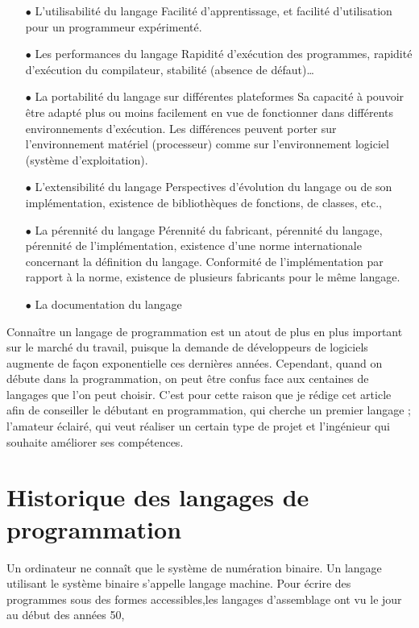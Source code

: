\documentclass[a4paper,12pt]{article} %
\begin{document}
\begin{itemize}
\item[$\bullet$]L’utilisabilité du langage
Facilité d'apprentissage, et facilité d'utilisation pour un programmeur expérimenté.
\item[$\bullet$]Les performances du langage
Rapidité d'exécution des programmes, rapidité d'exécution du compilateur,  stabilité (absence de défaut)…
\item[$\bullet$]La portabilité du langage sur différentes plateformes
Sa capacité à pouvoir être adapté plus ou moins facilement en vue de fonctionner dans différents environnements d'exécution. Les différences peuvent porter sur l'environnement matériel (processeur) comme sur l'environnement logiciel (système d'exploitation).
\item[$\bullet$]L’extensibilité du langage
Perspectives d'évolution du langage ou de son implémentation, existence de bibliothèques de fonctions, de classes, etc.,
\item[$\bullet$]La pérennité du langage
Pérennité du fabricant, pérennité du langage, pérennité de l'implémentation, existence d'une norme internationale concernant la définition du langage. Conformité de l'implémentation par rapport à la norme, existence de plusieurs fabricants pour le même langage.
\item[$\bullet$]La documentation du langage
\end{itemize}
Connaître un langage de programmation est un atout de plus en plus important sur le marché du travail, puisque la demande de développeurs de logiciels augmente de façon exponentielle ces dernières années.
Cependant, quand on débute dans la programmation, on peut être confus face aux centaines de langages que l’on peut choisir. C’est pour cette raison que je rédige cet article afin de conseiller le débutant en programmation, qui cherche un premier langage ; l’amateur éclairé, qui veut réaliser un certain type de projet et l’ingénieur qui souhaite améliorer ses compétences.



\section{Historique des langages de programmation} %

Un ordinateur ne connaît que le système de numération binaire. Un langage utilisant le système binaire s'appelle langage machine.
Pour écrire des programmes sous des formes accessibles,les langages d'assemblage ont vu le jour au début des années 50, 
 
\end{document}
